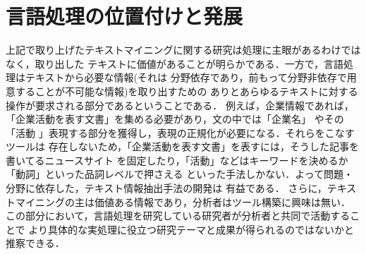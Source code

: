 \documentclass[twocolumn]{jarticle}
\begin{document}
\section{言語処理の位置付けと発展}
上記で取り上げたテキストマイニングに関する研究は処理に主眼があるわけではなく，取り出した
テキストに価値があることが明らかである．一方で，言語処理はテキストから必要な情報(それは
分野依存であり，前もって分野非依存で用意することが不可能な情報)を取り出すための
ありとあらゆるテキストに対する操作が要求される部分であるということである．
例えば，企業情報であれば，「企業活動を表す文書」を集める必要があり，文の中では「企業名」
やその「活動 」表現する部分を獲得し，表現の正規化が必要になる．それらをこなすツールは
存在しないため，「企業活動を表す文書」を表すには，そうした記事を書いてるニュースサイト
を固定したり，「活動」などはキーワードを決めるか「動詞」といった品詞レベルで押さえる
といった手法しかない．よって問題・分野に依存した，テキスト情報抽出手法の開発は
有益である．
さらに，テキストマイニングの主は価値ある情報であり，分析者はツール構築に興味は無い．
この部分において，言語処理を研究している研究者が分析者と共同で活動することで
より具体的な実処理に役立つ研究テーマと成果が得られるのではないかと推察できる．




\end{document}
